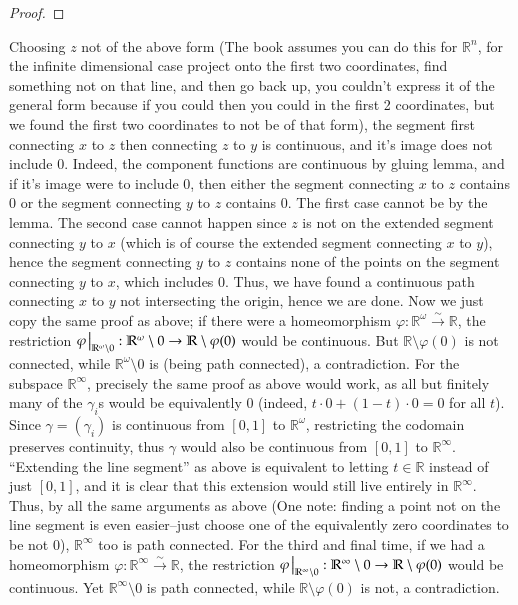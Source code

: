 \documentclass[12pt]{article}
\theoremstyle{definitionstyle}
\def\mbb#1{\mathbb{#1}}
\def \R{\mbb{R}}
\def \cph{\varphi}
\begin{document}
\begin{enumerate}[leftmargin=\labelsep]
\begin{proof}
		\end{proof} Choosing $z$ not of the above form (The book assumes you can do this for $\R^n$, for the infinite dimensional case project onto the first two coordinates, find something not on that line, and then go back up, you couldn't express it of the general form because if you could then you could in the first 2 coordinates, but we found the first two coordinates to not be of that form), the segment first connecting $x$ to $z$ then connecting $z$ to $y$ is continuous, and it's image does not include 0. Indeed, the component functions are continuous by gluing lemma, and if it's image were to include 0, then either the segment connecting $x$ to $z$ contains 0 or the segment connecting $y$ to $z$ contains 0. The first case cannot be by the lemma. The second case cannot happen since $z$ is not on the extended segment connecting $y$ to $x$ (which is of course the extended segment connecting $x$ to $y$), hence the segment connecting $y$ to $z$ contains none of the points on the segment connecting $y$ to $x$, which includes 0. Thus, we have found a continuous path connecting $x$ to $y$ not intersecting the origin, hence we are done. Now we just copy the same proof as above; if there were a homeomorphism $\cph: \R^\omega \overset{\sim}{\to} \R$, the restriction $\cph \eval_{\R^\omega \setminus 0}: \R^\omega \setminus 0 \to \R \setminus \cph(0)$ would be continuous. But $\R \setminus \cph(0)$ is not connected, while $\R^\omega \setminus 0$ is (being path connected), a contradiction. For the subspace $\R^\infty$, precisely the same proof as above would work, as all but finitely many of the $\gamma_i$s would be equivalently 0 (indeed, $t \cdot 0 + (1-t) \cdot 0 = 0$ for all $t$). Since $\gamma = (\gamma_i)$ is continuous from $[0,1]$ to $\R^\omega$, restricting the codomain preserves continuity, thus $\gamma$ would also be continuous from $[0,1]$ to $\R^\infty$. ``Extending the line segment'' as above is equivalent to letting $t \in \R$ instead of just $[0,1]$, and it is clear that this extension would still live entirely in $\R^\infty$. Thus, by all the same arguments as above (One note: finding a point not on the line segment is even easier--just choose one of the equivalently zero coordinates to be not 0), $\R^\infty$ too is path connected. For the third and final time, if we had a homeomorphism $\cph: \R^\infty \overset{\sim}{\to} \R$, the restriction $\cph \eval_{\R^\infty \setminus 0}: \R^\infty \setminus 0 \to \R \setminus \cph(0)$ would be continuous. Yet $\R^\infty \setminus 0$ is path connected, while $\R \setminus \cph(0)$ is not, a contradiction.
	\end{enumerate}
\end{document}
